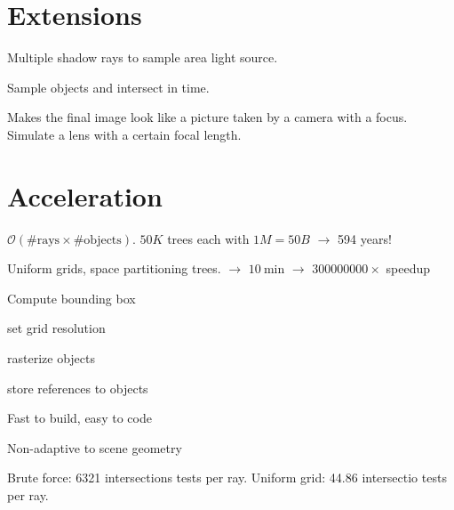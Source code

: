 \begin{compactdesc}
\section{Extensions}
	\item[\lp{Refraction}] \mbox\\
	\item[\lp{multiple lights}]
	\item[\lp{Area lights for soft shadows}] Multiple shadow rays to sample area light source.
	\item[\lp{Motion blur}] Sample objects and intersect in time.
		\begin{center}
		\end{center}
	\item[\lp{Depth of field}] Makes the final image look like a picture taken by a camera with a focus. Simulate a lens with a certain focal length.
\section{Acceleration}
\item[\lp{Cost}]
$\mathcal{O}(\#\text{rays}\times \#\text{objects})$. $50K$ trees each with $1M=50B$ $\to$ 594 years!
\item[\lp{Solution}] Uniform grids, space partitioning trees. $\to$ $\SI{10}{\minute}$ $\to$ $300000000\times$ speedup
\item[\lp{Uniform grids - preprocessing}]\mbox\\
	\begin{enumerate*}[label=\protect\circled{\arabic*},itemjoin=]
		\item Compute bounding box\\
		\item set grid resolution\\
		\item rasterize objects\\
		\item store references to objects
	\end{enumerate*}
	\item[\lp{Uniform grids - advantages}] Fast to build, easy to code
	\item[\lp{Uniform grids - disadvantages}] Non-adaptive to scene geometry
	\item[\lp{Uniform grids - example: tea pot}] Brute force: 6321 intersections tests per ray. Uniform grid: 44.86 intersectio tests per ray.
	\item[\lp{Space partitioning trees}]\mbox\\
\end{compactdesc}
